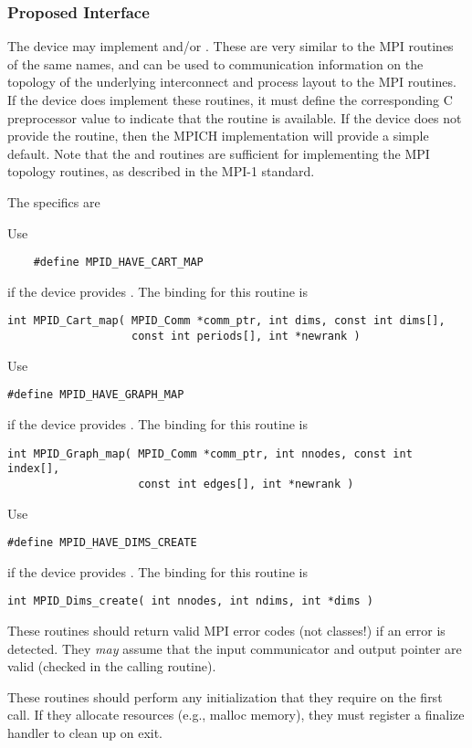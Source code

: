 \documentclass{article}
\begin{document}
\subsubsection{Proposed Interface}
The device may implement  and/or  .
These are very similar to the MPI routines of the same names, and can be used
to communication information on the topology of the underlying interconnect
and process layout to the MPI routines.  If the device does implement these
routines, it must define the corresponding C preprocessor value to indicate
that the routine is available.  If the device does not provide the routine,
then the MPICH implementation will provide a simple default.  Note that 
the  and  routines are sufficient for
implementing the MPI topology routines, as described in the MPI-1 standard.

The specifics are

Use
\begin{verbatim}
    #define MPID_HAVE_CART_MAP 
\end{verbatim}
if the device provides .  The binding for this routine is
\begin{verbatim}
int MPID_Cart_map( MPID_Comm *comm_ptr, int dims, const int dims[], 
                   const int periods[], int *newrank )
\end{verbatim}
Use 
\begin{verbatim}
#define MPID_HAVE_GRAPH_MAP
\end{verbatim}
if the device provides .  The binding for this routine is
\begin{verbatim}
int MPID_Graph_map( MPID_Comm *comm_ptr, int nnodes, const int index[], 
                    const int edges[], int *newrank )
\end{verbatim}
Use
\begin{verbatim}
#define MPID_HAVE_DIMS_CREATE
\end{verbatim}
if the device provides .  The binding for this routine
is 
\begin{verbatim}
int MPID_Dims_create( int nnodes, int ndims, int *dims )
\end{verbatim}

These routines should return valid MPI error codes (not classes!) if an error
is detected.  They \emph{may} assume that the input communicator and output
pointer are valid (checked in the calling routine). 

These routines should perform any initialization that they require on the
first call.  If they allocate resources (e.g., malloc memory), they must
register a finalize handler to clean up on exit. 
\end{document}
